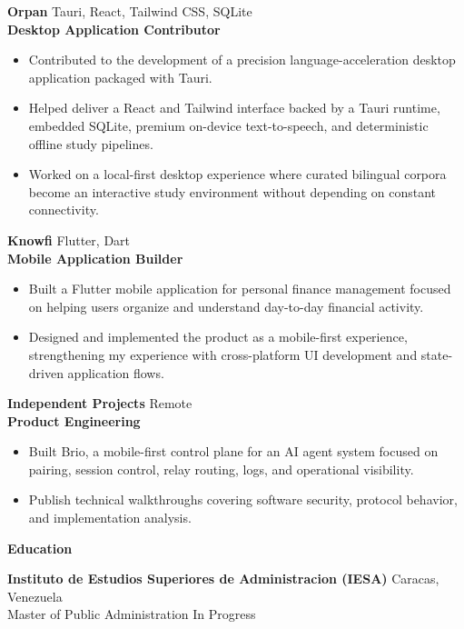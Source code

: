 \documentclass[11pt]{article}
\begin{document}
\textbf{Orpan} \hfill Tauri, React, Tailwind CSS, SQLite \\
\textbf{Desktop Application Contributor}
\begin{itemize}
    \item Contributed to the development of a precision language-acceleration desktop application packaged with Tauri.
    \item Helped deliver a React and Tailwind interface backed by a Tauri runtime, embedded SQLite, premium on-device text-to-speech, and deterministic offline study pipelines.
    \item Worked on a local-first desktop experience where curated bilingual corpora become an interactive study environment without depending on constant connectivity.
\end{itemize}

\vspace{10pt}

\textbf{Knowfi} \hfill Flutter, Dart \\
\textbf{Mobile Application Builder}
\begin{itemize}
    \item Built a Flutter mobile application for personal finance management focused on helping users organize and understand day-to-day financial activity.
    \item Designed and implemented the product as a mobile-first experience, strengthening my experience with cross-platform UI development and state-driven application flows.
\end{itemize}

\vspace{10pt}

\textbf{Independent Projects} \hfill Remote \\
\textbf{Product Engineering}
\begin{itemize}
    \item Built Brio, a mobile-first control plane for an AI agent system focused on pairing, session control, relay routing, logs, and operational visibility.
    \item Publish technical walkthroughs covering software security, protocol behavior, and implementation analysis.
\end{itemize}

\begin{center}
    \textbf{Education}
\end{center}

\textbf{Instituto de Estudios Superiores de Administracion (IESA)} \hfill Caracas, Venezuela \\
Master of Public Administration \hfill In Progress
\end{document}
